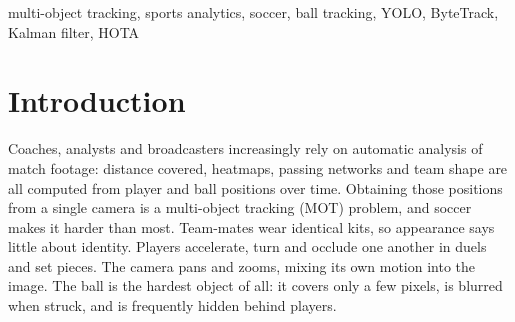 \documentclass[conference]{IEEEtran}
\begin{document}
\begin{abstract}
Sports analytics needs two signals from a match video: where each player is,
under an identity that does not change, and where the ball is. This work builds
and evaluates a tracking-by-detection system for soccer that runs on an ordinary
laptop CPU with pretrained models only. A COCO-pretrained YOLO11n network
detects people and the ball in one pass per frame. ByteTrack links the player
detections into persistent tracks, and a constant-velocity Kalman filter follows
the ball, filling short detection gaps with positions that are always marked as
predictions. A motion stage extends the ball tracker to shots, when the blurred
ball is invisible to the detector. We compare ByteTrack against SORT and OC-SORT
on identical cached detections over six test sequences from SportsMOT and
UVY-Track, and evaluate the ball on 13 sequences from UVY-Track and
InFactory. On SportsMOT, ByteTrack makes the fewest identity switches
(51 against 60 for SORT and 106 for
OC-SORT), whereas SORT reaches the highest HOTA (65.9 against
62.6). On the partially labelled UVY-Track clips ByteTrack has the
best OWTA (56.8). Against published SportsMOT results, the gap to
the best tracker (Deep-EIoU, HOTA 77.2) lies almost entirely in
detection accuracy, not in association. For the ball, the tracker improves F1 on
the held-out InFactory clips (51.0 against 47.1) but
not on UVY-Track, and its clearest benefit is a far more continuous ball track.
\end{abstract}

\begin{IEEEkeywords}
multi-object tracking, sports analytics, soccer, ball tracking, YOLO, ByteTrack,
Kalman filter, HOTA
\end{IEEEkeywords}

\section{Introduction}
Coaches, analysts and broadcasters increasingly rely on automatic analysis of
match footage: distance covered, heatmaps, passing networks and team shape are
all computed from player and ball positions over time. Obtaining those
positions from a single camera is a multi-object tracking (MOT) problem, and
soccer makes it harder than most. Team-mates wear identical kits, so appearance
says little about identity. Players accelerate, turn and occlude one another in
duels and set pieces. The camera pans and zooms, mixing its own motion into the
image. The ball is the hardest object of all: it covers only a few pixels, is
blurred when struck, and is frequently hidden behind players.
\end{document}
